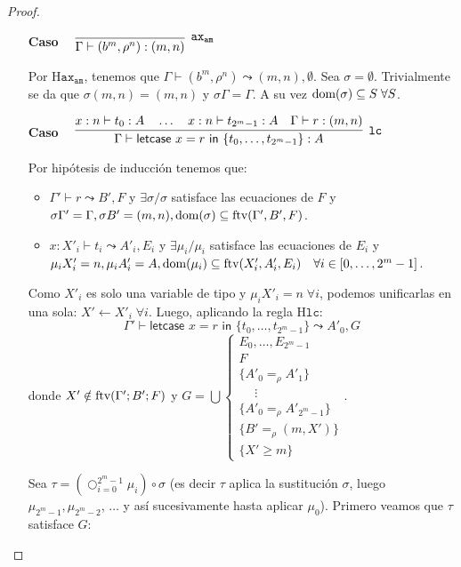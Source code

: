 \begin{proof}
\begin{itemize}
\vspace{\baselineskip}
     \item[\textbf{Caso}] \(\quad\raisebox{-.35\baselineskip}{\infer[\mathtt{ax_{am}}]
         {\Gamma \vdash (b^m, \rho^n) : (m, n)}
         {}}\)


Por $\text{H}\mathtt{ax_{am}}$, tenemos que $\Gamma \vdash (b^m, \rho^n)\leadsto (m, n), \emptyset$. Sea $\sigma=\emptyset$. Trivialmente se da que $\sigma (m, n) = (m, n)$ y $\sigma \Gamma = \Gamma$. A su vez $\text{dom}(\sigma) \subseteq S\;\forall S$.

\vspace{\baselineskip}
     \item[\textbf{Caso}] \(\quad\raisebox{-.35\baselineskip}{\infer[\mathtt{lc}]
     {\Gamma \vdash \textsf{letcase } x = r \textsf{ in  }\{t_0,\dots,t_{2^m-1}\} : A}
     {x:n\vdash t_0 : A \quad \dots\quad x:n\vdash t_{2^m-1}:A\quad \Gamma \vdash r:(m, n)}}\)

Por hipótesis de inducción tenemos que:
\begin{itemize}
    \item $\Gamma' \vdash r \leadsto B', F$ y $\exists \sigma / \sigma$ satisface las ecuaciones de $F$ y $\sigma \Gamma'=\Gamma, \sigma B' = (m, n), \text{dom}(\sigma) \subseteq \text{ftv}(\Gamma',B',F)$. 
    \item $x: X'_i \vdash t_i \leadsto A'_i, E_i$ y $\exists \mu_i/\mu_i$ satisface las ecuaciones de $E_i$ y $\mu_i X'_i = n, \mu_i A'_i = A, \text{dom}(\mu_i)\subseteq \text{ftv}(X'_i,A'_i,E_i) \quad \forall i \in [0,\dots,2^m-1]$.
\end{itemize}

Como $X'_i$ es solo una variable de tipo y $\mu_i X'_i=n\;\forall i$, podemos unificarlas en una sola: $X' \leftarrow X'_i\;\forall i$. Luego, aplicando la regla $\text{H}\mathtt{lc}$:
\[\Gamma'\vdash \textsf{letcase } x = r \textsf{ in } \{t_0,\dots,t_{2^m-1}\} \leadsto A'_0, G\]
donde $X' \notin \text{ftv}(\Gamma';B';F)$ y \(G=\bigcup \begin{cases}
    E_0, \dots, E_{2^m-1} \\
    F \\
    \{A'_0 =_\rho A'_1\} \\
    \quad\; \vdots \\
    \{A'_0 =_\rho A'_{2^m-1}\} \\
    \{B' =_\rho (m, X')\} \\
    \{X'\geq m\}
\end{cases}\).

Sea $\tau = \left(\bigcirc_{i=0}^{2^m-1} \mu_i\right) \circ \sigma$ (es decir $\tau$ aplica la sustitución $\sigma$, luego $\mu_{2^m-1}, \mu_{2^m-2}$, $\dots$ y así sucesivamente hasta aplicar $\mu_0$). Primero veamos que $\tau$ satisface $G$:
   

\end{itemize}
\end{proof}
